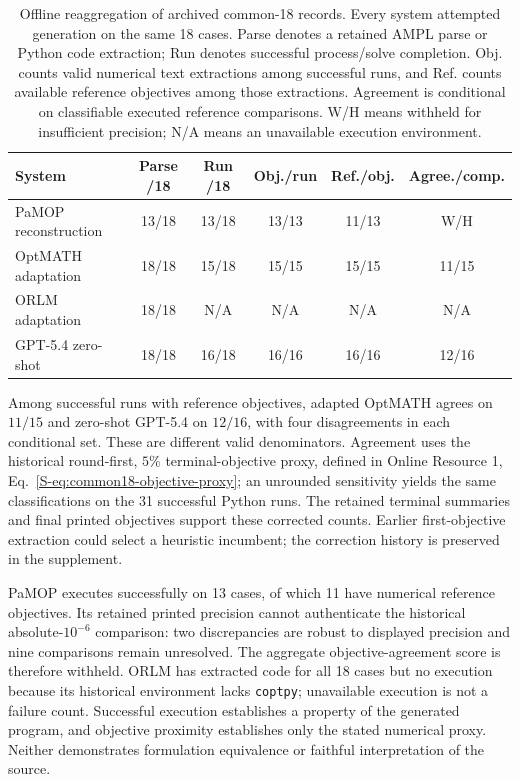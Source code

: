 \documentclass[pdflatex,iicol,sn-basic,Numbered]{sn-jnl}
\begin{document}
\begin{table}[t]
\centering
  \renewcommand{\arraystretch}{1.18}\small
\caption{Offline reaggregation of archived common-18 records. Every system attempted generation on the same 18 cases. Parse denotes a retained AMPL parse or Python code extraction; Run denotes successful process/solve completion. Obj. counts valid numerical text extractions among successful runs, and Ref. counts available reference objectives among those extractions. Agreement is conditional on classifiable executed reference comparisons. W/H means withheld for insufficient precision; N/A means an unavailable execution environment.}
\label{tab:ext-outcomes}
\setlength{\tabcolsep}{2.5pt}
\begin{tabular}{@{}lccccc@{}}
\toprule
System & Parse /18 & Run /18 & Obj./run & Ref./obj. & Agree./comp.\\
\midrule
PaMOP reconstruction & 13/18 & 13/18 & 13/13 & 11/13 & W/H\\
OptMATH adaptation & 18/18 & 15/18 & 15/15 & 15/15 & 11/15\\
ORLM adaptation & 18/18 & N/A & N/A & N/A & N/A\\
GPT-5.4 zero-shot & 18/18 & 16/18 & 16/16 & 16/16 & 12/16\\
\bottomrule
\end{tabular}
\end{table}

Among successful runs with reference objectives, adapted OptMATH agrees on $11/15$ and zero-shot GPT-5.4 on $12/16$, with four disagreements in each conditional set. These are different valid denominators. Agreement uses the historical round-first, $5\%$ terminal-objective proxy, defined in Online Resource 1, Eq.~\eqref{S-eq:common18-objective-proxy}; an unrounded sensitivity yields the same classifications on the 31 successful Python runs. The retained terminal summaries and final printed objectives support these corrected counts. Earlier first-objective extraction could select a heuristic incumbent; the correction history is preserved in the supplement.

PaMOP executes successfully on 13 cases, of which 11 have numerical reference objectives. Its retained printed precision cannot authenticate the historical absolute-$10^{-6}$ comparison: two discrepancies are robust to displayed precision and nine comparisons remain unresolved. The aggregate objective-agreement score is therefore withheld. ORLM has extracted code for all 18 cases but no execution because its historical environment lacks \texttt{coptpy}; unavailable execution is not a failure count. Successful execution establishes a property of the generated program, and objective proximity establishes only the stated numerical proxy. Neither demonstrates formulation equivalence or faithful interpretation of the source.
\end{document}

